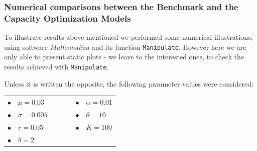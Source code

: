 \subsubsection{Numerical comparisons between the Benchmark and the Capacity Optimization Models}

To illustrate results above mentioned we performed some numerical illustrations, using software \textit{Mathematica} and its function \texttt{Manipulate}. However here we are only able to present static plots - we leave to the interested ones, to check the results achieved with \texttt{Manipulate}.

Unless it is written the opposite, the following parameter values were considered:


\begin{table}[!htb]
	\centering
	\begin{tabular}{lllllll}
		 $\bullet$ & $\mu=0.03$     &  & \hspace{7cm} &  &  $\bullet$ & $\alpha=0.01$ \\
		 $\bullet$ & $\sigma=0.005$ &  & \hspace{7cm} &  &  $\bullet$ & $\theta=10$   \\
		 $\bullet$ & $r=0.05$       &  & \hspace{7cm} &  &  $\bullet$ & $K=100$       \\
		 $\bullet$ & $\delta=2$                                
	\end{tabular}
\end{table}	

